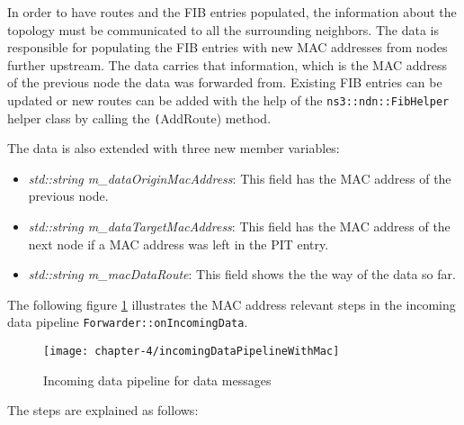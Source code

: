 In order to have routes and the FIB entries populated, the information about the topology must be communicated to all the surrounding neighbors. The data is responsible for populating the FIB entries with new MAC addresses from nodes further upstream. The data carries that information, which is the MAC address of the previous node the data was forwarded from. Existing FIB entries can be updated or new routes can be added with the help of the \texttt{ns3::ndn::FibHelper} helper class by calling the \texttt(AddRoute) method.

The data is also extended with three new member variables:

\begin{itemize}
\item \emph{std::string m\_dataOriginMacAddress}: This field has the MAC address of the previous node.
\item \emph{std::string m\_dataTargetMacAddress}: This field has the MAC address of the next node if a MAC address was left in the PIT entry.
\item \emph{std::string m\_macDataRoute}: This field shows the the way of the data so far.
\end{itemize}

The following figure \ref{fig:incomingDataPipelineWithMac} illustrates the MAC address relevant steps in the incoming data pipeline \texttt{Forwarder::onIncomingData}.

\begin{figure}[H]
  \centering
  \texttt{[image: chapter-4/incomingDataPipelineWithMac]}
  \caption{Incoming data pipeline for data messages}
  \label{fig:incomingDataPipelineWithMac}
\end{figure}

The steps are explained as follows:

